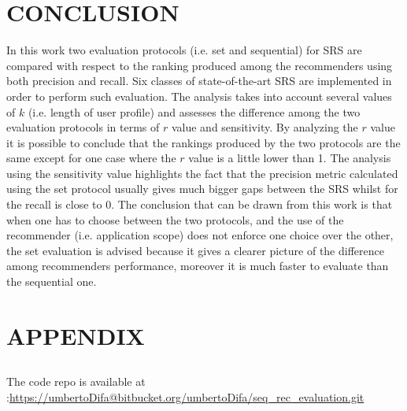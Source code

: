 \documentclass[prodmode,acmtecs]{acmsmall} %
\begin{document}
\section{CONCLUSION}
In this work two evaluation protocols (i.e. set and sequential) for SRS are compared with respect to the ranking produced among the recommenders using both precision and recall. Six classes of state-of-the-art SRS are implemented in order to perform such evaluation. The analysis takes into account several values of $k$ (i.e. length of user profile) and assesses the difference among the two evaluation protocols in terms of $r$ value and sensitivity. By analyzing the $r$ value it is possible to conclude that the rankings produced by the two protocols are the same except for one case where the $r$ value is a little lower than 1. The analysis using the sensitivity value highlights the fact that the precision metric calculated using the set protocol usually gives much bigger gaps between the SRS whilst for the recall is close to 0. The conclusion that can be drawn from this work is that when one has to choose between the two protocols, and the use of the recommender (i.e. application scope) does not enforce one choice over the other, the set evaluation is advised because it gives a clearer picture of the difference among recommenders performance, moreover it is much faster to evaluate than the sequential one.

\newpage
\section{APPENDIX}
\subsection{}
The code repo is available at :\href{https://umbertoDifa@bitbucket.org/umbertoDifa/seq_rec_evaluation.git}{https://umbertoDifa@bitbucket.org/umbertoDifa/seq\_rec\_evaluation.git}
\end{document}
